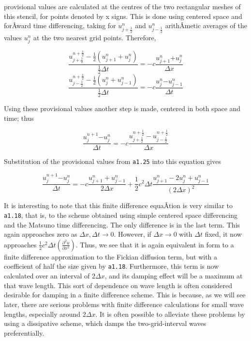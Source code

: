\begin{figure}
\centering
{}
\caption{}
\end{figure}

provisional values are calculated at the centres of the two rectangular
meshes of this stencil, for points denoted by x signs. This is done
using centered space and forÂ­ward time differencing, taking for
\(u_{j + \frac{1}{2}}^{n}\) and \(u_{j - \frac{1}{2}}^{n}\) arithÂ­metic
averages of the values \(u_{j}^{n}\) at the two nearest grid points.
Therefore,

{\[\frac{u_{j + \frac{1}{2}}^{n + \frac{1}{2}} - \frac{1}{2}\left( u_{j + 1}^{n} + u_{j}^{n} \right)}
{\frac{1}{2}\Delta t} = - c \frac{u_{j + 1}^{n}{+ u}_{j}^{n}}{\Delta x}\]\[\frac{u_{j - \frac{1}{2}}^{n + \frac{1}{2}} - \frac{1}{2}\left( u_{j}^{n} + u_{j - 1}^{n} \right)}{\frac{1}{2}\Delta t} = - c \frac{u_{j}^{n}{- u}_{j - 1}^{n}}{\Delta t}\]}

Using these provisional values another step is made, centered in both
space and time; thus

{\[\frac{u_{j}^{n + 1}{- u}_{j}^{n}}{\Delta t} =
 - c \frac{u_{j + \frac{1}{2}}^{n + \frac{1}{2}} - u_{j - \frac{1}{2}}^{n + \frac{1}{2}}}{\Delta x}\]}

Substitution of the provisional values from \texttt{a1.25} into this
equation gives

{\[\frac{u_{j}^{n + 1}{- u}_{j}^{n}}{\Delta t} =
 - c\frac{u_{j + 1}^{n} + u_{j - 1}^{n}}{2\Delta x} +
  \frac{1}{2}c^{2}\Delta t\frac{u_{j + 1}^{n} - 2u_{j}^{n} + u_{j - 1}^{n}}
  {\left( 2\Delta x \right)^{2}}\]}

It is interesting to note that this finite difference equaÂ­tion is very
similar to \texttt{a1.18}, that is, to the scheme obtained using simple
centered space differencing and the Matsuno time differencing. The only
difference is in the last term. This again approaches zero as
\(\Delta x,\Delta t \rightarrow 0\). However, if
\(\Delta x \rightarrow 0\) with \(\Delta t\) fixed, it now approaches
\(\frac{1}{2}c^{2}\Delta t\left( \frac{\partial^{2}u}{\partial x^{2}} \right)\).
Thus, we see that it is again equivalent in form to a finite difference
approximation to the Fickian diffusion term, but with a coefficient of
half the size given by \texttt{a1.18}. Furthermore, this term is now
calculated over an interval of \(2\Delta x\), and its damping effect
will be a maximum at that wave length. This sort of dependence on wave
length is often considered desirable for damping in a finite difference
scheme. This is because, as we will see later, there are serious
problems with finite difference calculations for small wave lengths,
especially around \(2\Delta x\). It is often possible to alleviate these
problems by using a dissipative scheme, which damps the
two-grid-interval waves preferentially.

